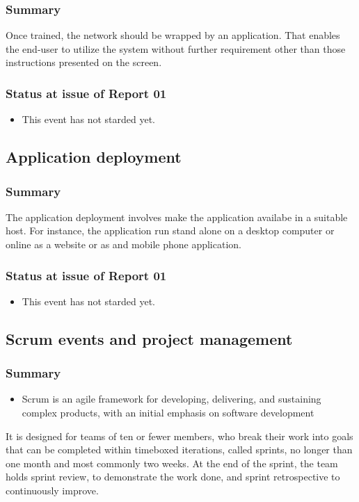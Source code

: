 \documentclass{article}
\begin{document}
\subsubsection{Summary}
\label{sec:org5509097}
Once trained, the network should be wrapped by an application.
That enables the end-user to utilize the system without further requirement other than those instructions presented on the screen.
\subsubsection{Status at issue of Report 01}
\label{sec:orgebe1d81}
\begin{itemize}
\item This event has not starded yet.
\end{itemize}

\subsection{Application deployment}
\label{sec:org81b590b}
\subsubsection{Summary}
\label{sec:org1b81dbc}
The application deployment involves make the application availabe in a suitable host.
For instance, the application run stand alone on a desktop computer or online as a website or as and mobile phone application.
\subsubsection{Status at issue of Report 01}
\label{sec:orge0301d6}
\begin{itemize}
\item This event has not starded yet.
\end{itemize}

\subsection{Scrum events and project management}
\label{sec:org1cb0c37}
\subsubsection{Summary}
\label{sec:org6b409e9}
\begin{itemize}
\item Scrum is an agile framework for developing, delivering, and sustaining complex products, with an initial emphasis on software development
\end{itemize}
It is designed for teams of ten or fewer members, who break their work into goals that can be completed within timeboxed iterations, called sprints, no longer than one month and most commonly two weeks.
At the end of the sprint, the team holds sprint review, to demonstrate the work done, and sprint retrospective to continuously improve.
\end{document}
